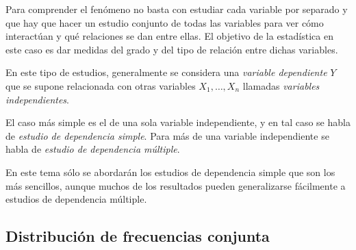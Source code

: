 \begin{frame}
{Para comprender el fenómeno no basta con estudiar cada variable por separado y que hay que hacer un estudio conjunto de todas
las variables para ver cómo interactúan y qué relaciones se dan entre ellas. El objetivo de la estadística en este caso es dar medidas del
grado y del tipo de relación entre dichas variables.

En este tipo de estudios, generalmente se considera una \emph{variable dependiente} $Y$ que se supone relacionada con otras variables
$X_1,\ldots,X_n$ llamadas \emph{variables independientes}.

El caso más simple es el de una sola variable independiente, y en tal caso se habla de \emph{estudio de dependencia simple}. Para más de una
variable independiente se habla de \emph{estudio de dependencia múltiple}.

En este tema sólo se abordarán los estudios de dependencia simple que son los más sencillos, aunque muchos de los resultados pueden
generalizarse fácilmente a estudios de dependencia múltiple.}
\end{frame}


\subsection{Distribución de frecuencias conjunta}

